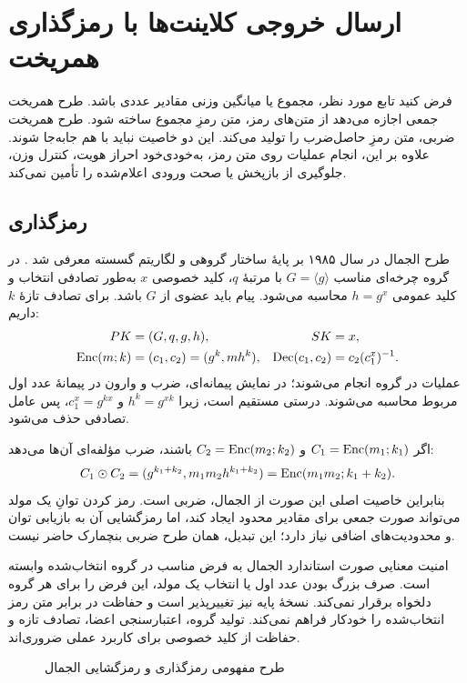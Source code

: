 \section{ارسال خروجی کلاینت‌ها با رمزگذاری همریخت}
فرض کنید تابع مورد نظر، مجموع یا میانگین وزنی مقادیر عددی باشد. طرح همریخت جمعی اجازه می‌دهد از متن‌های رمز، متن رمزِ مجموع ساخته شود. طرح همریخت ضربی، متن رمزِ حاصل‌ضرب را تولید می‌کند. این دو خاصیت نباید با هم جابه‌جا شوند. علاوه بر این، انجام عملیات روی متن رمز، به‌خودی‌خود احراز هویت، کنترل وزن، جلوگیری از بازپخش یا صحت ورودی اعلام‌شده را تأمین نمی‌کند.

\subsection{رمزگذاری }
طرح الجمال در سال ۱۹۸۵ بر پایۀ ساختار گروهی و لگاریتم گسسته معرفی شد \cite{ref178}. در گروه چرخه‌ای مناسب $G=\langle g\rangle$ با مرتبۀ $q$، کلید خصوصی $x$ به‌طور تصادفی انتخاب و کلید عمومی $h=g^x$ محاسبه می‌شود. پیام باید عضوی از $G$ باشد. برای تصادف تازۀ $k$ داریم:
\begin{align}
PK&=(G,q,g,h),&SK&=x,\\
\operatorname{Enc}(m;k)&=(c_1,c_2)=(g^k,mh^k),&
\operatorname{Dec}(c_1,c_2)&=c_2(c_1^x)^{-1}.
\label{eq:elgamal}
\end{align}
عملیات در گروه انجام می‌شوند؛ در نمایش پیمانه‌ای، ضرب و وارون در پیمانۀ عدد اول مربوط محاسبه می‌شوند. درستی مستقیم است، زیرا $h^k=g^{xk}$ و $c_1^x=g^{kx}$، پس عامل تصادفی حذف می‌شود.

اگر $C_1=\operatorname{Enc}(m_1;k_1)$ و $C_2=\operatorname{Enc}(m_2;k_2)$ باشند، ضرب مؤلفه‌ای آن‌ها می‌دهد:
\begin{equation}
C_1\odot C_2=(g^{k_1+k_2},m_1m_2h^{k_1+k_2})
=\operatorname{Enc}(m_1m_2;k_1+k_2).
\end{equation}
بنابراین خاصیت اصلی این صورت از الجمال، ضربی است. رمز کردن توانِ یک مولد می‌تواند صورت جمعی برای مقادیر محدود ایجاد کند، اما رمزگشایی آن به بازیابی توان و محدودیت‌های اضافی نیاز دارد؛ این تبدیل، همان طرح ضربی بنچمارک حاضر نیست.

امنیت معنایی صورت استاندارد الجمال به فرض مناسب  در گروه انتخاب‌شده وابسته است. صرف بزرگ بودن عدد اول یا انتخاب یک مولد، این فرض را برای هر گروه دلخواه برقرار نمی‌کند. نسخۀ پایه نیز تغییرپذیر است و حفاظت در برابر متن رمز انتخاب‌شده را خودکار فراهم نمی‌کند. تولید گروه، اعتبارسنجی اعضا، تصادف تازه و حفاظت از کلید خصوصی برای کاربرد عملی ضروری‌اند.
\begin{figure}[htbp]
\centering
\caption{طرح مفهومی رمزگذاری و رمزگشایی الجمال}
\label{fig:elgamal}
\end{figure}

